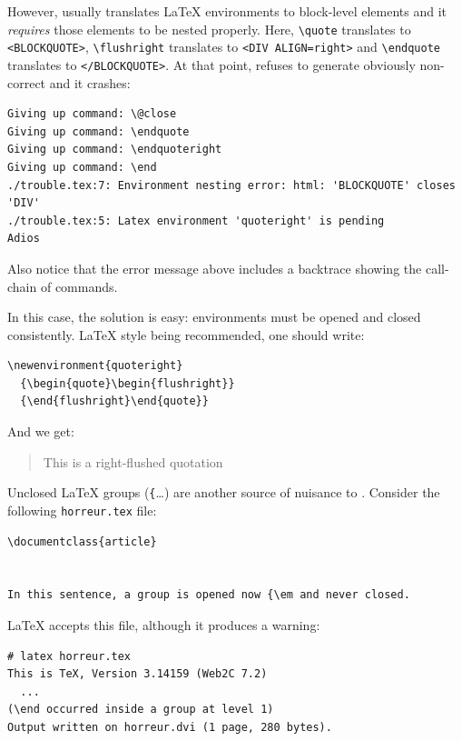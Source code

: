However,  \hevea{} usually translates \LaTeX{} environments  to \html{}
block-level elements and it \emph{requires}
those elements to be nested properly.
Here, \verb+\quote+ translates to \verb+<BLOCKQUOTE>+,
\verb+\flushright+ translates to \verb+<DIV ALIGN=right>+ and
\verb+\endquote+ translates to \verb+</BLOCKQUOTE>+.
At that point, \hevea{} refuses to generate obviously
non-correct {\html} and it crashes:
\begin{verbatim}
Giving up command: \@close
Giving up command: \endquote
Giving up command: \endquoteright
Giving up command: \end
./trouble.tex:7: Environment nesting error: html: 'BLOCKQUOTE' closes 'DIV'
./trouble.tex:5: Latex environment 'quoteright' is pending
Adios
\end{verbatim}
Also notice that the error message above includes a backtrace showing
the call-chain of commands.

In this case, the solution is easy: environments must be opened and
closed consistently. \LaTeX{} style being recommended, one should write:
\begin{verbatim}
\newenvironment{quoteright}
  {\begin{quote}\begin{flushright}}
  {\end{flushright}\end{quote}}
\end{verbatim}
And we get:
\begin{htmlout}\newenvironment{quoteright}{\begin{quote}\begin{flushright}}{\end{flushright}\end{quote}}
\begin{htmlonly}
\begin{quoteright}
This is a right-flushed quotation
\end{quoteright}
\end{htmlonly}
\end{htmlout}


Unclosed \LaTeX{} groups (\verb+{+\ldots{}) are another source
of nuisance to \hevea{}.
Consider the following \texttt{horreur.tex} file:
\begin{verbatim}
\documentclass{article}


In this sentence, a group is opened now {\em and never closed.

\end{verbatim}
\LaTeX{} accepts this file, although it produces a warning:
\begin{verbatim}
# latex horreur.tex 
This is TeX, Version 3.14159 (Web2C 7.2)
  ...
(\end occurred inside a group at level 1)
Output written on horreur.dvi (1 page, 280 bytes).

\end{verbatim}

